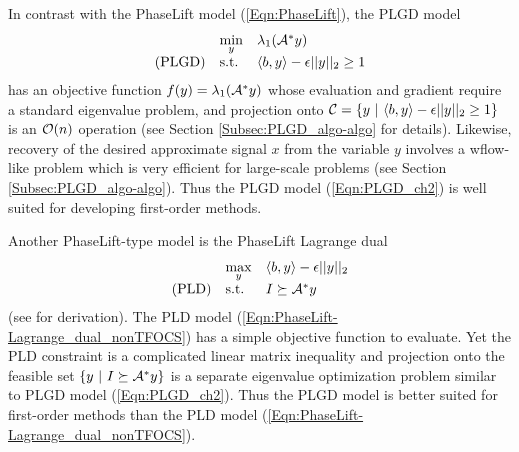 In contrast with the PhaseLift model (\ref{Eqn:PhaseLift}), the PLGD model 
\begin{equation} 			\label{Eqn:PLGD_ch2}
\begin{array}{lll}
	&	\min\limits_{\substack{y}}
		&	\lambda_1({\mathcal A}^* y)		\\
\textnormal{(PLGD)}
	&	\textnormal{s.t.}
		&	\langle b, y \rangle - \epsilon ||y||_2 \geq 1
\end{array}
\end{equation}
has an objective function $f(y) = \lambda_1({\mathcal A}^* y)$ whose evaluation and gradient require a standard eigenvalue problem, and projection onto ${\mathcal C} = \{y \ | \ \langle b, y \rangle - \epsilon ||y||_2 \geq 1\}$ is an ${\mathcal O}(n)$ operation (see Section \ref{Subsec:PLGD_algo-algo} for details).  Likewise, recovery of the desired approximate signal $x$ from the variable $y$ involves a wflow-like problem which is very efficient for large-scale problems (see Section \ref{Subsec:PLGD_algo-algo}).  Thus the PLGD model (\ref{Eqn:PLGD_ch2}) is well suited for developing first-order methods.

Another PhaseLift-type model is the PhaseLift Lagrange dual
\begin{equation} 			\label{Eqn:PhaseLift-Lagrange_dual_nonTFOCS}
\begin{array}{lll}
&	\max\limits_{\substack{y}}
					&	\langle b, y \rangle - \epsilon ||y||_2
						\\
\textnormal{(PLD)}
				&	\textnormal{s.t.}
					&	I \succeq {\mathcal A}^*y
\end{array}
\end{equation}
(see \cite[Chapter 5]{boyd2004convex} for derivation).  The PLD model (\ref{Eqn:PhaseLift-Lagrange_dual_nonTFOCS}) has a simple objective function to evaluate.  Yet the PLD constraint is a complicated linear matrix inequality and projection onto the feasible set $\{ y \ | \ I \succeq {\mathcal A}^*y \}$ is a separate eigenvalue optimization problem similar to PLGD model (\ref{Eqn:PLGD_ch2}).  Thus the PLGD model is better suited for first-order methods than the PLD model (\ref{Eqn:PhaseLift-Lagrange_dual_nonTFOCS}).



